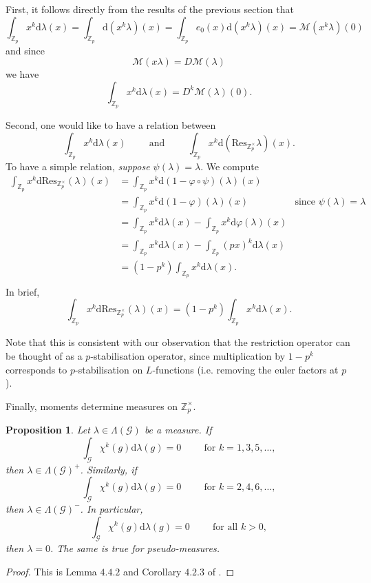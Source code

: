 \documentclass[twoside,10pt]{article}
\newtheorem{prop}{Proposition}
\newcommand{\esp}{\hspace{1cm}}
\newcommand{\myand}{\hspace{1cm}\text{and}\hspace{1cm}}
\newcommand{\Z}{\mathbb{Z}}
\newcommand{\curlG}{\mathcal{G}}
\newcommand{\curlM}{\mathcal{M}}
\renewcommand{\d}{\text{d}}
\newcommand{\Res}{\text{Res}_{\Z_p^\times}}
\begin{document}
First, it follows directly from the results of the previous section that
\[\int_{\Z_p}x^k\d\lambda(x)=\int_{\Z_p}\d(x^k\lambda)(x)=\int_{\Z_p}e_0(x)\d(x^k\lambda)(x)=\curlM(x^k\lambda)(0)\]
and since
\[\curlM(x\lambda)=D\curlM(\lambda)\]
we have
\begin{equation}\label{eq:momentsandD}
	\int_{\Z_p}x^k\d\lambda(x)=D^k\curlM(\lambda)(0).
\end{equation}


Second, one would like to have a relation between
\[\int_{\Z_p}x^k\d\lambda(x)\myand \int_{\Z_p}x^k\d(\Res\lambda)(x).\]
To have a simple relation, \emph{suppose $\psi(\lambda)=\lambda$}. We compute
\begin{align*}
	\int_{\Z_p}x^k\d\Res(\lambda)(x) 	&= \int_{\Z_p}x^k\d(1-\varphi\circ\psi)(\lambda)(x) &\\																							&= \int_{\Z_p}x^k\d(1-\varphi)(\lambda)(x)			&\text{since $\psi(\lambda)=\lambda$}\\
										&= \int_{\Z_p}x^k\d\lambda(x)-\int_{\Z_p}x^k\d\varphi(\lambda)(x) &\\
										&= \int_{\Z_p}x^k\d\lambda(x)-\int_{\Z_p}(px)^k\d\lambda(x) &\\
										&= (1-p^k)\int_{\Z_p}x^k\d\lambda(x). &\\
\end{align*}
In brief,
\begin{equation}\label{eq:momentsofres}
	\int_{\Z_p}x^k\d\Res(\lambda)(x)=(1-p^k)\int_{\Z_p}x^k\d\lambda(x).
\end{equation}

Note that this is consistent with our observation that the restriction operator can be thought of as a $p$-stabilisation operator, since multiplication by $1-p^k$ corresponds to $p$-stabilisation on $L$-functions (i.e. removing the euler factors at $p$).

Finally, moments determine measures on $\Z_p^\times$.

\begin{prop}
	Let $\lambda\in\Lambda(\curlG)$ be a measure. If
	\[\int_\curlG\chi^k(g)\d\lambda(g)=0\esp\text{for }k=1,3,5,\dots,\]
	then $\lambda\in\Lambda(\curlG)^+$. Similarly, if
	\[\int_\curlG\chi^k(g)\d\lambda(g)=0\esp\text{for }k=2,4,6,\dots,\]
	then $\lambda\in\Lambda(\curlG)^-$. In particular,
	\[\int_\curlG\chi^k(g)\d\lambda(g)=0\esp\text{for all }k>0,\]
	then $\lambda=0$. The same is true for pseudo-measures.
\end{prop}
\begin{proof}
	This is Lemma $4.4.2$ and Corollary $4.2.3$ of \cite{CS}.
\end{proof}
\end{document}

